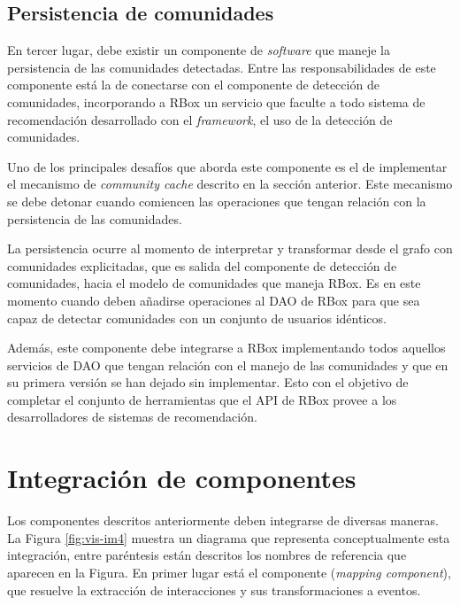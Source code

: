 \subsection{Persistencia de comunidades}

En tercer lugar, debe existir un componente de \textit{software} que maneje la persistencia de las comunidades detectadas. Entre las responsabilidades de este componente está la de conectarse con el componente de detección de comunidades, incorporando a RBox un servicio que faculte a todo sistema de recomendación desarrollado con el \textit{framework}, el uso de la detección de comunidades.

Uno de los principales desafíos que aborda este componente es el de implementar el mecanismo de \textit{community \textit{cache}} descrito en la sección anterior. Este mecanismo se debe detonar cuando comiencen las operaciones que tengan relación con la persistencia de las comunidades.

La persistencia ocurre al momento de interpretar y transformar desde el grafo con comunidades explicitadas, que es salida del componente de detección de comunidades, hacia el modelo de comunidades que maneja RBox. Es en este momento cuando deben añadirse operaciones al DAO de RBox para que sea capaz de detectar comunidades con un conjunto de usuarios idénticos.

Además, este componente debe integrarse a RBox implementando todos aquellos servicios de DAO que tengan relación con el manejo de las comunidades y que en su primera versión se han dejado sin implementar. Esto con el objetivo de completar el conjunto de herramientas que el API de RBox provee a los desarrolladores de sistemas de recomendación.

\section{Integración de componentes}

Los componentes descritos anteriormente deben integrarse de diversas maneras. La Figura \ref{fig:vis-im4} muestra un diagrama que representa conceptualmente esta integración, entre paréntesis están descritos los nombres de referencia que aparecen en la Figura. En primer lugar está el componente (\textit{\textit{mapping} component}), que resuelve la extracción de interacciones y sus transformaciones a eventos.

